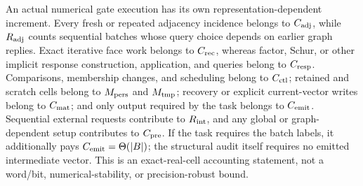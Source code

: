 \begin{remark}
An actual numerical gate execution has its own representation-dependent
increment.  Every fresh or repeated adjacency incidence belongs to
$C_{\rm adj}$, while $R_{\rm adj}$ counts sequential batches whose query
choice depends on earlier graph replies.  Exact iterative face work belongs to $C_{\rm rec}$,
whereas factor, Schur, or other implicit response construction, application,
and queries belong to $C_{\rm resp}$.  Comparisons, membership changes, and
scheduling belong to $C_{\rm ctl}$; retained and scratch cells belong to
$M_{\rm pers}$ and $M_{\rm tmp}$; recovery or explicit current-vector writes
belong to $C_{\rm mat}$; and only output required by the task belongs to
$C_{\rm emit}$.  Sequential external requests contribute to $R_{\rm int}$,
and any global or graph-dependent setup contributes to $C_{\rm pre}$.
If the task requires the batch labels, it additionally pays
$C_{\rm emit}=\Theta(|B|)$; the structural audit itself requires no emitted
intermediate vector.  This is an exact-real-cell accounting statement, not a
word/bit, numerical-stability, or precision-robust bound.
\end{remark}

